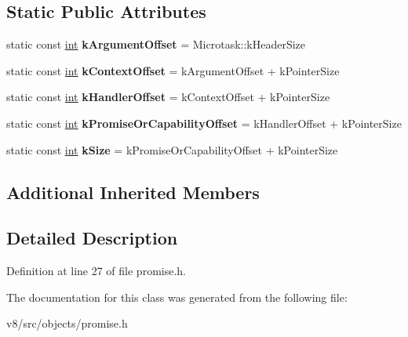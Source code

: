 \subsection*{Static Public Attributes}
\begin{DoxyCompactItemize}
\item 
\mbox{\label{classv8_1_1internal_1_1PromiseReactionJobTask_a4f43bac9dbbd47a0662b1b3f8638ab71}} 
static const \mbox{\hyperlink{classint}{int}} {\bfseries k\+Argument\+Offset} = Microtask\+::k\+Header\+Size
\item 
\mbox{\label{classv8_1_1internal_1_1PromiseReactionJobTask_a68e58f9ed0f2c435568c83b5f5e17234}} 
static const \mbox{\hyperlink{classint}{int}} {\bfseries k\+Context\+Offset} = k\+Argument\+Offset + k\+Pointer\+Size
\item 
\mbox{\label{classv8_1_1internal_1_1PromiseReactionJobTask_a1a1995b8dd2d2da5d7ca31e73eca55ec}} 
static const \mbox{\hyperlink{classint}{int}} {\bfseries k\+Handler\+Offset} = k\+Context\+Offset + k\+Pointer\+Size
\item 
\mbox{\label{classv8_1_1internal_1_1PromiseReactionJobTask_a260e67e3438f11563f73b41c42e19d68}} 
static const \mbox{\hyperlink{classint}{int}} {\bfseries k\+Promise\+Or\+Capability\+Offset} = k\+Handler\+Offset + k\+Pointer\+Size
\item 
\mbox{\label{classv8_1_1internal_1_1PromiseReactionJobTask_a359766638b69aa6d918491842d5f20ce}} 
static const \mbox{\hyperlink{classint}{int}} {\bfseries k\+Size} = k\+Promise\+Or\+Capability\+Offset + k\+Pointer\+Size
\end{DoxyCompactItemize}
\subsection*{Additional Inherited Members}


\subsection{Detailed Description}


Definition at line 27 of file promise.\+h.



The documentation for this class was generated from the following file\+:\begin{DoxyCompactItemize}
\item 
v8/src/objects/promise.\+h\end{DoxyCompactItemize}
